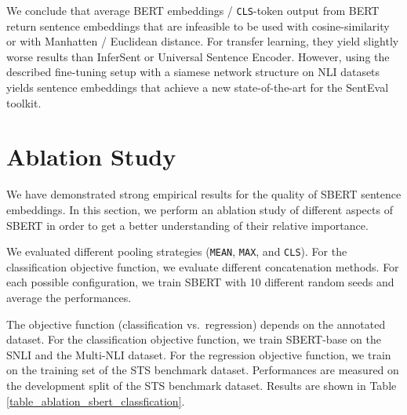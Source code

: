 \documentclass[11pt,a4paper]{article}
\begin{document}
We conclude that average BERT embeddings / \texttt{CLS}-token output from BERT return sentence embeddings that are infeasible to be used with cosine-similarity or with Manhatten / Euclidean distance. For transfer learning, they yield slightly worse results than InferSent or Universal Sentence Encoder. However, using the described fine-tuning setup with a siamese network structure on NLI datasets yields sentence embeddings that achieve a new state-of-the-art for the SentEval toolkit.    





\section{Ablation Study} \label{sec_ablation_study}

We have demonstrated strong empirical results for the quality of SBERT sentence embeddings. In this section, we perform an ablation study of different aspects of SBERT in order to get a better understanding of their relative importance.

We evaluated different pooling strategies (\texttt{MEAN}, \texttt{MAX}, and \texttt{CLS}). For the classification objective function, we evaluate different concatenation methods. For each possible configuration, we train SBERT with 10 different random seeds and average the performances. 

The objective function (classification vs.\ regression) depends on the annotated dataset. For the classification objective function, we train SBERT-base on the SNLI and the Multi-NLI dataset. For the regression objective function, we train on the training set of the STS benchmark dataset. Performances are measured on the development split of the STS benchmark dataset. Results are shown in Table \ref{table_ablation_sbert_classfication}. 
\end{document}

